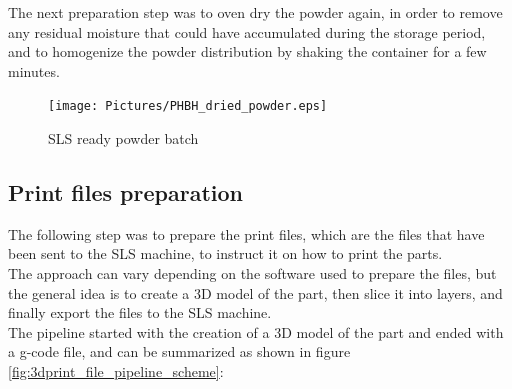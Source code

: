 \documentclass{article}
\begin{document}
      The next preparation step was to oven dry the powder again, in order to remove any residual moisture
      that could have accumulated during the storage period, and to homogenize the powder distribution 
      by shaking the container for a few minutes. \\
  
                  \begin{figure}[h!]
                      \centering
                      \texttt{[image: Pictures/PHBH\_dried\_powder.eps]}
                      \caption{SLS ready powder batch}
                      \label{fig:PHBH_collected_powder}
                      
                  \end{figure}
  
          \subsection{Print files preparation\label{Print_files_preparation}}
  
          The following step was to prepare the print files, which are the files that have been sent to the SLS machine, 
          to instruct it on how to print the parts. \\
  
          The approach can vary depending on the software used to prepare the files, but the general idea is to 
          create a 3D model of the part, then slice it into layers, and finally export the files to the SLS machine. \\
  
          The pipeline started with the creation of a 3D model of the part and ended with a g-code file, and can 
          be summarized as shown in figure \ref{fig:3dprint_file_pipeline_scheme}: 
          
\end{document}
